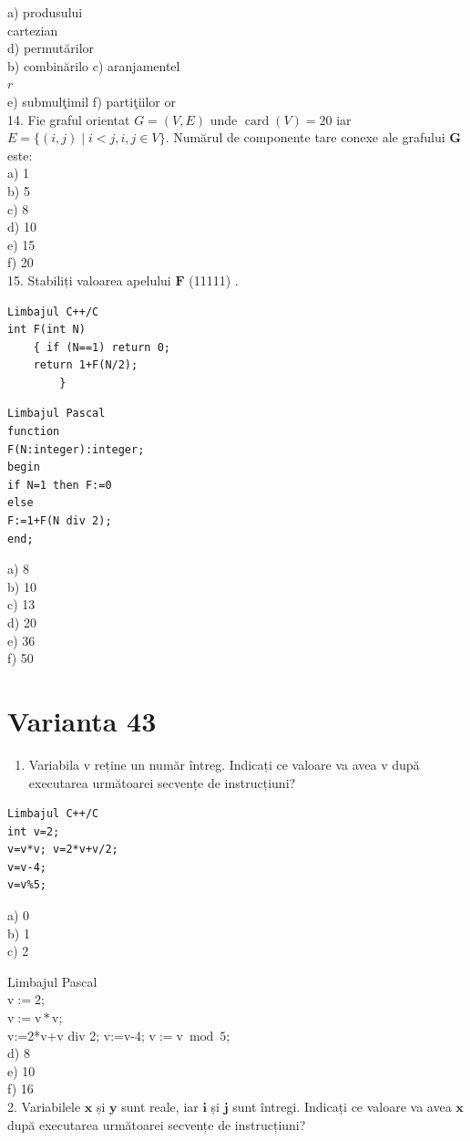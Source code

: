 \documentclass[10pt]{article}
\begin{document}
a) produsului\\
cartezian\\
d) permutărilor\\
b) combinărilo c) aranjamentel\\
$r$\\
e) submulţimil f) partiţiilor or\\
14. Fie graful orientat $G=(V, E)$ unde $\operatorname{card}(V)=20$ iar $E=\{(i, j) \mid i<j, i, j \in V\}$. Numărul de componente tare conexe ale grafului $\mathbf{G}$ este:\\
a) 1\\
b) 5\\
c) 8\\
d) 10\\
e) 15\\
f) 20\\
15. Stabiliți valoarea apelului $\mathbf{F}$ (11111) .

\begin{verbatim}
Limbajul C++/C
int F(int N)
    { if (N==1) return 0;
    return 1+F(N/2);
        }
\end{verbatim}

\begin{verbatim}
Limbajul Pascal
function
F(N:integer):integer;
begin
if N=1 then F:=0
else
F:=1+F(N div 2);
end;
\end{verbatim}

a) 8\\
b) 10\\
c) 13\\
d) 20\\
e) 36\\
f) 50

\section*{Varianta 43}
\begin{enumerate}
  \item Variabila v reține un număr întreg. Indicați ce valoare va avea v după executarea următoarei secvențe de instrucțiuni?
\end{enumerate}

\begin{verbatim}
Limbajul C++/C
int v=2;
v=v*v; v=2*v+v/2;
v=v-4;
v=v%5;
\end{verbatim}

a) 0\\
b) 1\\
c) 2

Limbajul Pascal\\
$\mathrm{v}:=2$;\\
$\mathrm{v}:=\mathrm{v} * \mathrm{v}$;\\
v:=2*v+v div 2; v:=v-4; $\mathrm{v}:=\mathrm{v} \bmod 5$;\\
d) 8\\
e) 10\\
f) 16\\
2. Variabilele $\mathbf{x}$ și $\mathbf{y}$ sunt reale, iar $\mathbf{i}$ și $\mathbf{j}$ sunt întregi. Indicați ce valoare va avea $\mathbf{x}$ după executarea următoarei secvențe de instrucțiuni?
\end{document}
